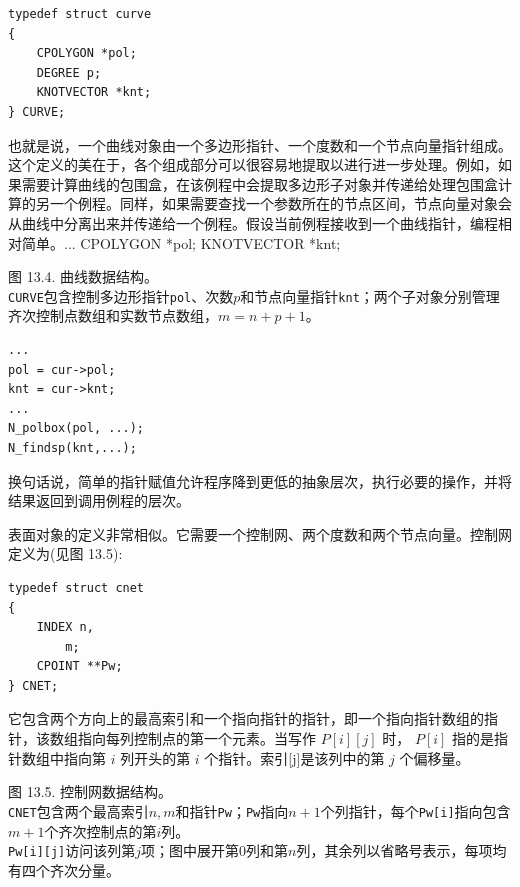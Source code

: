 \documentclass[../main.tex]{subfiles}
\begin{document}
\begin{verbatim}
typedef struct curve
{
    CPOLYGON *pol;
    DEGREE p;
    KNOTVECTOR *knt;
} CURVE;
\end{verbatim}

也就是说，一个曲线对象由一个多边形指针、一个度数和一个节点向量指针组成。这个定义的美在于，各个组成部分可以很容易地提取以进行进一步处理。例如，如果需要计算曲线的包围盒，在该例程中会提取多边形子对象并传递给处理包围盒计算的另一个例程。同样，如果需要查找一个参数所在的节点区间，节点向量对象会从曲线中分离出来并传递给一个例程。假设当前例程接收到一个曲线指针，编程相对简单。... CPOLYGON *pol; KNOTVECTOR *knt;



\begin{center}
\begin{minipage}{26cm}
\centering
{}
\par\smallskip
图 13.4. 曲线数据结构。\\
\texttt{CURVE}包含控制多边形指针\texttt{pol}、次数$p$和节点向量指针\texttt{knt}；两个子对象分别管理齐次控制点数组和实数节点数组，$m=n+p+1$。
\end{minipage}
\end{center}

\begin{verbatim}
...
pol = cur->pol;
knt = cur->knt;
...
N_polbox(pol, ...);
N_findsp(knt,...);
\end{verbatim}

换句话说，简单的指针赋值允许程序降到更低的抽象层次，执行必要的操作，并将结果返回到调用例程的层次。

表面对象的定义非常相似。它需要一个控制网、两个度数和两个节点向量。控制网定义为(见图 13.5):

\begin{verbatim}
typedef struct cnet
{
    INDEX n,
        m;
    CPOINT **Pw;
} CNET;
\end{verbatim}

它包含两个方向上的最高索引和一个指向指针的指针，即一个指向指针数组的指针，该数组指向每列控制点的第一个元素。当写作 \(P\left\lbrack  i\right\rbrack  \left\lbrack  j\right\rbrack\) 时， \(P\left\lbrack  i\right\rbrack\) 指的是指针数组中指向第 \(i\) 列开头的第 \(i\) 个指针。索引[j]是该列中的第 \(j\) 个偏移量。

\begin{center}
\begin{minipage}{26cm}
\centering
{}
\par\smallskip
图 13.5. 控制网数据结构。\\
\texttt{CNET}包含两个最高索引$n,m$和指针\texttt{Pw}；\texttt{Pw}指向$n+1$个列指针，每个\texttt{Pw[i]}指向包含$m+1$个齐次控制点的第$i$列。\\
\texttt{Pw[i][j]}访问该列第$j$项；图中展开第0列和第$n$列，其余列以省略号表示，每项均有四个齐次分量。
\end{minipage}
\end{center}
\end{document}
